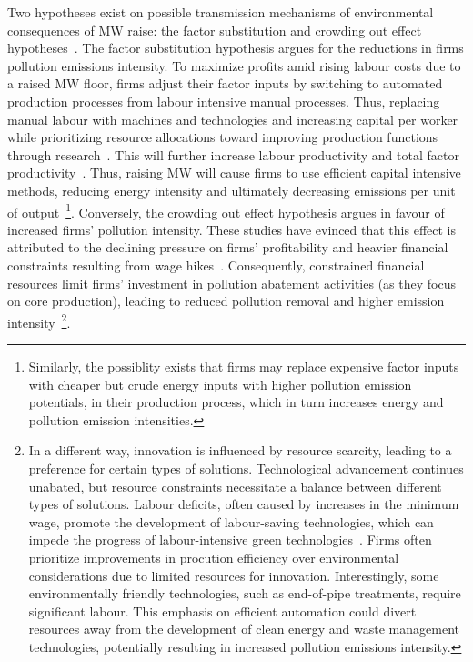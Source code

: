 \documentclass[12pt, english]{article}
\begin{document}
    Two hypotheses exist on possible transmission mechanisms of environmental consequences of MW raise: the factor substitution and crowding out effect hypotheses~\parencite{zhang2023unintended}. The factor substitution hypothesis argues for the reductions in firms pollution emissions intensity. To maximize profits amid rising labour costs due to a raised MW floor, firms adjust their factor inputs by switching to automated production processes from labour intensive manual processes. Thus, replacing manual labour with machines and technologies and increasing capital per worker while prioritizing resource allocations toward improving production functions through research~\parencite{harasztosi2019pays,hau2020firm, geng2022minimum,dai2023minimum, li2020labor}. This will further increase labour productivity and total factor productivity~\parencite{riley2017raising}. Thus, raising MW will cause firms to use efficient capital intensive methods, reducing energy intensity and ultimately decreasing emissions per unit of output~\footnote{\tiny Similarly, the possiblity exists that firms may replace expensive factor inputs with cheaper but crude energy inputs with higher pollution emission potentials, in their production process, which in turn increases energy and pollution emission intensities.}. Conversely, the crowding out effect hypothesis argues in favour of increased firms' pollution intensity. These studies have evinced that this effect is attributed to the declining pressure on firms' profitability and heavier financial constraints resulting from wage hikes~\parencite{draca2011minimum, bell2018minimum, du2022minimum}. Consequently, constrained financial resources limit firms' investment in pollution abatement activities (as they focus on core production), leading to reduced pollution removal and higher emission intensity~\footnote{\tiny In a different way, innovation is influenced by resource scarcity, leading to a preference for certain types of solutions. Technological advancement continues unabated, but resource constraints necessitate a balance between different types of solutions. Labour deficits, often caused by increases in the minimum wage, promote the development of labour-saving technologies, which can impede the progress of labour-intensive green technologies~\parencite{acemoglu2010does}. Firms often prioritize improvements in procution efficiency over environmental considerations due to limited resources for innovation. Interestingly, some environmentally friendly technologies, such as end-of-pipe treatments, require significant labour. This emphasis on efficient automation could divert resources away from the development of clean energy and waste management technologies, potentially resulting in increased pollution emissions intensity.}.
\end{document}

